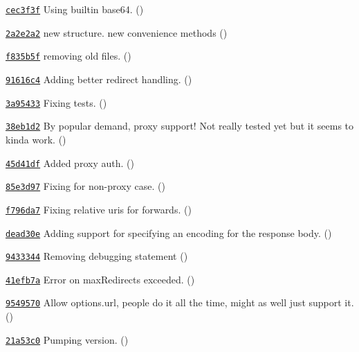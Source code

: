 \begin{DoxyItemize}
\item \href{https://github.com/mikeal/request/commit/cec3f3f619322f27e2a82c7fd8971722f98d04d6}{\tt cec3f3f} Using builtin base64. ()
\item \href{https://github.com/mikeal/request/commit/2a2e2a2f5c4760d4da3caa1a0f2d14c31a4222dc}{\tt 2a2e2a2} new structure. new convenience methods ()
\item \href{https://github.com/mikeal/request/commit/f835b5fb605506b8ecd3c17bebe9ed54f0066cfc}{\tt f835b5f} removing old files. ()
\item \href{https://github.com/mikeal/request/commit/91616c4e4f488f75a8b04b5b6f0ceef7e814cffd}{\tt 91616c4} Adding better redirect handling. ()
\item \href{https://github.com/mikeal/request/commit/3a95433cbec9693a16ff365148489a058720ae7c}{\tt 3a95433} Fixing tests. ()
\item \href{https://github.com/mikeal/request/commit/38eb1d2fa8dea582bb7c3fb37a7b05ff91857a46}{\tt 38eb1d2} By popular demand, proxy support! Not really tested yet but it seems to kinda work. ()
\item \href{https://github.com/mikeal/request/commit/45d41dff63f36b25b3403e59c8b172b7aa9ed373}{\tt 45d41df} Added proxy auth. ()
\item \href{https://github.com/mikeal/request/commit/85e3d97e0dced39a3769c4e3f2707ba3aaab1eaa}{\tt 85e3d97} Fixing for non-\/proxy case. ()
\item \href{https://github.com/mikeal/request/commit/f796da74849d2b0732bd1bae1d2dcaf1243142c1}{\tt f796da7} Fixing relative uri\textquotesingle{}s for forwards. ()
\item \href{https://github.com/mikeal/request/commit/dead30ebef9c3ff806b895e2bd32f52ba3988c69}{\tt dead30e} Adding support for specifying an encoding for the response body. ()
\item \href{https://github.com/mikeal/request/commit/943334488dcc8e7f90727b86f9eb1bc502c33b4f}{\tt 9433344} Removing debugging statement ()
\item \href{https://github.com/mikeal/request/commit/41efb7a7dcca3b47e97c23c6cdbd3e860d3bd82b}{\tt 41efb7a} Error on max\+Redirects exceeded. ()
\item \href{https://github.com/mikeal/request/commit/95495701fa4e99a3ab85acdab71ecdaabe0dbd45}{\tt 9549570} Allow options.\+url, people do it all the time, might as well just support it. ()
\item \href{https://github.com/mikeal/request/commit/21a53c016edcc113e809219639807b46d29dba36}{\tt 21a53c0} Pumping version. ()

\end{DoxyItemize}
